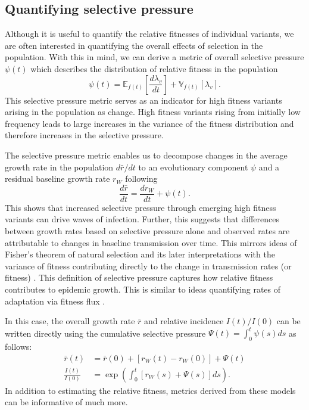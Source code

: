 \documentclass[11pt,oneside,letterpaper]{article}
\newcommand{\Expect}{\mathbb{E}}
\newcommand{\Var}{\mathbb{V}}
\newcommand{\wt}{W}
\begin{document}
\subsection*{Quantifying selective pressure}

Although it is useful to quantify the relative fitnesses of individual variants, we are often interested in quantifying the overall effects of selection in the population.
With this in mind, we can derive a metric of overall selective pressure $\psi(t)$ which describes the distribution of relative fitness in the population
\begin{equation}
\psi(t) =  \Expect_{f(t)}\left[ \frac{d \lambda_v}{d t}\right] +  \Var_{f(t)}[\lambda_{v}].
\end{equation}
This selective pressure metric serves as an indicator for high fitness variants arising in the population as change.
High fitness variants rising from initially low frequency leads to large increases in the variance of the fitness distribution and therefore increases in the selective pressure.

The selective pressure metric enables us to decompose changes in the average growth rate in the population $d\bar{r}/dt$ to an evolutionary component $\psi$ and a residual baseline growth rate $r_\wt$ following
\begin{equation}
    \frac{d\bar{r}}{dt} = \frac{dr_{\wt}}{dt} + \psi(t).
\end{equation}
This shows that increased selective pressure through emerging high fitness variants can drive waves of infection.
Further, this suggests that differences between growth rates based on selective pressure alone and observed rates are attributable to changes in baseline transmission over time.
This mirrors ideas of Fisher's theorem of natural selection and its later interpretations with the variance of fitness contributing directly to the change in transmission rates (or fitness) \cite{Ewens1989, Ewens2024}.
This definition of selective pressure captures how relative fitness contributes to epidemic growth.
This is similar to ideas quantifying rates of adaptation via fitness flux \cite{Mustonen2010}.

In this case, the overall growth rate $\bar{r}$ and relative incidence $I(t) / I(0)$ can be written directly using the cumulative selective pressure $\Psi(t) = \int_0^t \psi(s)ds$ as follows:
\begin{align}
    \bar{r}(t) &= \bar{r}(0) + [r_{\wt}(t) - r_{\wt}(0)] + \Psi(t)\\
    \frac{I(t)}{I(0)} &= \exp \left( \int_0^t [r_{\wt}(s) + \Psi(s)]ds \right).
\end{align}
In addition to estimating the relative fitness, metrics derived from these models can be informative of much more.
\end{document}
